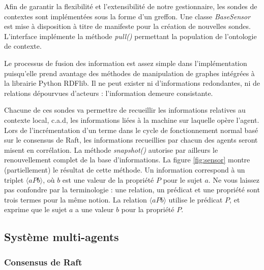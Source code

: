 Afin de garantir la flexibilité et l'extensibilité de notre gestionnaire, les
sondes de contextes sont implémentées sous la forme d'un greffon. Une classe
\emph{BaseSensor} est mise à disposition à titre de manifeste pour la création
de nouvelles sondes. L'interface implémente la méthode \emph{pull()} permettant
la population de l'ontologie de contexte.

Le processus de fusion des information est assez simple dans l'implémentation
puisqu'elle prend avantage des méthodes de manipulation de graphes intégrées à
la librairie Python RDFlib. Il ne peut exister ni d'informations redondantes, ni
de relations dépourvues d'acteurs : l'information demeure consistante.

Chacune de ces sondes va permettre de recueillir les informations relatives au
contexte local, c.a.d, les informations liées à la machine sur laquelle opère
l'agent. Lors de l'incrémentation d'un terme dans le cycle de fonctionnement
normal basé sur le consensus de Raft, les informations recueillies par chacun
des agents seront misent en corrélation. La méthode \emph{snapshot()} autorise
par ailleurs le renouvellement complet de la base d'informations.  La figure
\ref{fig:sensor} montre (partiellement) le résultat de cette méthode.  Un
information correspond à un triplet $\langle a P b \rangle$, où $b$ est une
valeur de la propriété $P$ pour le sujet $a$. Ne vous laissez pas confondre par
la terminologie : une relation, un prédicat et une propriété sont trois termes
pour la même notion. La relation $\langle a P b \rangle$ utilise le prédicat
$P$, et exprime que le sujet $a$ a une valeur $b$ pour la propriété $P$.

\subsection{Système multi-agents}

\subsubsection{Consensus de Raft}

